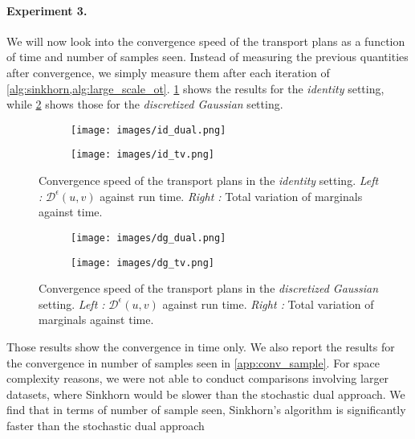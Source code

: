 \documentclass[a4paper,11pt]{article}
\newcommand{\1}{\mathbbm{1}}
\begin{document}
\paragraph{Experiment 3.}We will now look into the convergence speed of the transport plans as a function of time and number of samples seen. Instead of measuring the previous quantities after convergence, we simply measure them after each iteration of \cref{alg:sinkhorn,alg:large_scale_ot}. \cref{fig:exp3_id} shows the results for the \emph{identity} setting, while \cref{fig:exp3_dg1} shows those for the \emph{discretized Gaussian} setting.

\begin{figure}[H]
    \centering
    \begin{subfigure}{0.48\linewidth}
        \centering
        \texttt{[image: images/id\_dual.png]}
    \end{subfigure}%
    \hfill
    \begin{subfigure}{0.48\linewidth}
        \centering
        \texttt{[image: images/id\_tv.png]}
    \end{subfigure}
    \caption{Convergence speed of the transport plans in the \emph{identity} setting. \emph{Left :} $\mathcal{D}^{\epsilon}(u, v)$ against run time. \emph{Right :} Total variation of marginals against time.}
    \label{fig:exp3_id}
\end{figure}

\begin{figure}[H]
    \centering
    \begin{subfigure}{0.48\linewidth}
        \centering
        \texttt{[image: images/dg\_dual.png]}
    \end{subfigure}%
    \hfill
    \begin{subfigure}{0.48\linewidth}
        \centering
        \texttt{[image: images/dg\_tv.png]}
    \end{subfigure}
    \caption{Convergence speed of the transport plans in the \emph{discretized Gaussian} setting. \emph{Left :} $\mathcal{D}^{\epsilon}(u, v)$ against run time. \emph{Right :} Total variation of marginals against time.}
    \label{fig:exp3_dg1}
\end{figure}

Those results show the convergence in time only. We also report the results for the convergence in number of samples seen in \cref{app:conv_sample}. For space complexity reasons, we were not able to conduct comparisons involving larger datasets, where Sinkhorn would be slower than the stochastic dual approach. We find that in terms of number of sample seen, Sinkhorn's algorithm is significantly faster than the stochastic dual approach
\end{document}
